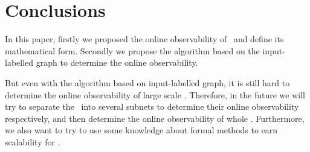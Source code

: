 \section{Conclusions}
\label{sec:con}
In this paper, firstly we proposed the online observability of \BCNs\ and define its mathematical form. Secondly we propose the algorithm based on the input-labelled graph to determine the online observability. %


But even with the algorithm based on input-labelled graph, it is still hard to determine the online observability of large scale \BCNs. Therefore, in the future we will try to separate the \BCN\ into several subnets to determine their online observability respectively, and then determine the online observability of whole \BCN. Furthermore, we also want to try to use some knowledge about formal methods to earn scalability for \BCNs. 

